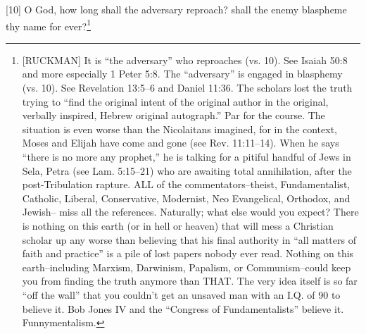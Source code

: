 [10] \textcolor[rgb]{0.00,0.00,1.00}{O God, how long shall the adversary reproach? shall the enemy blaspheme thy name for ever?}\footnote{[RUCKMAN] It is “the adversary” who reproaches (vs. 10). See Isaiah 50:8 and more especially 1 Peter 5:8. The “adversary” is engaged in blasphemy (vs. 10). See Revelation 13:5--6 and Daniel 11:36. The scholars lost the truth trying to “find the original intent of the original author in the original, verbally inspired, Hebrew original autograph.” Par for the course. The situation is even worse than the Nicolaitans imagined, for in the context, Moses and Elijah have come and gone (see Rev. 11:11--14). When he says “there is no more any prophet,” he is talking for a pitiful handful of Jews in Sela, Petra (see Lam. 5:15--21) who are awaiting total annihilation, after the post-Tribulation rapture. ALL of the commentators--theist, Fundamentalist, Catholic, Liberal, Conservative, Modernist, Neo Evangelical, Orthodox, and Jewish-- miss all the references. Naturally; what else would you expect? There is nothing on this earth (or in hell or heaven) that will mess a Christian scholar up any worse than believing that his final authority in “all matters of faith and practice” is a pile of lost papers nobody ever read. Nothing on this earth--including Marxism, Darwinism, Papalism, or Communism--could keep you from finding the truth anymore than THAT. The very idea itself is so far “off the wall” that you couldn’t get an unsaved man with an I.Q. of 90 to believe it. Bob Jones IV and the “Congress of Fundamentalists” believe it. Funnymentalism.\cite{Ruckman1992Psalms}}
